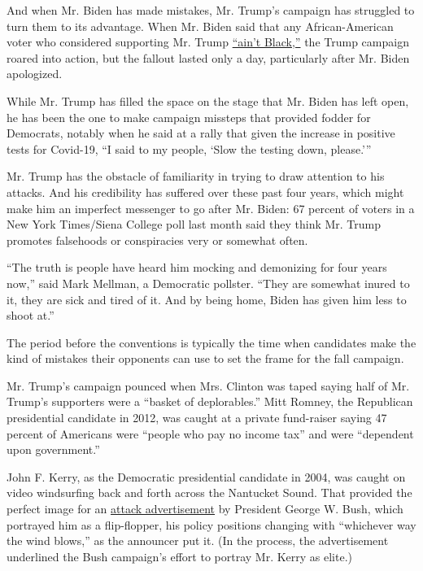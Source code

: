 And when Mr. Biden has made mistakes, Mr. Trump's campaign has struggled
to turn them to its advantage. When Mr. Biden said that any
African-American voter who considered supporting Mr. Trump
\href{https://www.nytimes.com/2020/05/22/us/politics/joe-biden-black-breakfast-club.html}{``ain't
Black,''} the Trump campaign roared into action, but the fallout lasted
only a day, particularly after Mr. Biden apologized.

While Mr. Trump has filled the space on the stage that Mr. Biden has
left open, he has been the one to make campaign missteps that provided
fodder for Democrats, notably when he said at a rally that given the
increase in positive tests for Covid-19, ``I said to my people, `Slow
the testing down, please.'''

Mr. Trump has the obstacle of familiarity in trying to draw attention to
his attacks. And his credibility has suffered over these past four
years, which might make him an imperfect messenger to go after Mr.
Biden: 67 percent of voters in a New York Times/Siena College poll last
month said they think Mr. Trump promotes falsehoods or conspiracies very
or somewhat often.

``The truth is people have heard him mocking and demonizing for four
years now,'' said Mark Mellman, a Democratic pollster. ``They are
somewhat inured to it, they are sick and tired of it. And by being home,
Biden has given him less to shoot at.''

The period before the conventions is typically the time when candidates
make the kind of mistakes their opponents can use to set the frame for
the fall campaign.

Mr. Trump's campaign pounced when Mrs. Clinton was taped saying half of
Mr. Trump's supporters were a ``basket of deplorables.'' Mitt Romney,
the Republican presidential candidate in 2012, was caught at a private
fund-raiser saying 47 percent of Americans were ``people who pay no
income tax'' and were ``dependent upon government.''

John F. Kerry, as the Democratic presidential candidate in 2004, was
caught on video windsurfing back and forth across the Nantucket Sound.
That provided the perfect image for an
\href{https://www.youtube.com/watch?v=2QpS2Am51Wo}{attack advertisement}
by President George W. Bush, which portrayed him as a flip-flopper, his
policy positions changing with ``whichever way the wind blows,'' as the
announcer put it. (In the process, the advertisement underlined the Bush
campaign's effort to portray Mr. Kerry as elite.)

